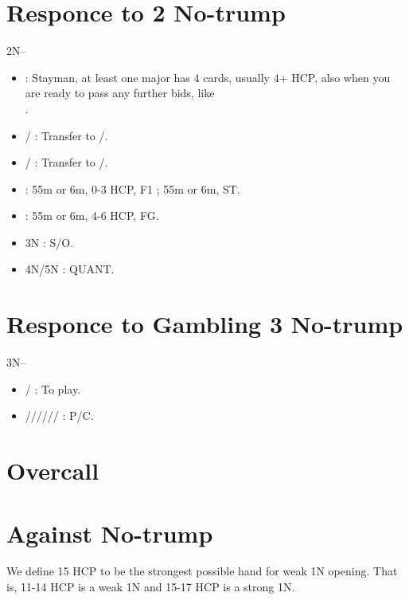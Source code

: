 \documentclass[12pt,twoside,a5paper]{report}%
\begin{document}
\chapter*{Responce to 2 No-trump}
	2N--\\
	\begin{itemize}
	\renewcommand{\labelitemi}{}
	\item {}: Stayman, at least one major has 4 cards, usually 4+ HCP, also when you are ready to pass any further bids, like \\.
	\item {}/ : Transfer to /.
	\item {}/ : Transfer to /.
	\item {} : 55m or 6m, 0-3 HCP, F1 ; 55m or 6m, ST.
	\item {} : 55m or 6m, 4-6 HCP,  FG. 
	\item 3N : S/O.
	\item 4N/5N : QUANT.
	\end{itemize}

\chapter*{Responce to Gambling 3 No-trump}
	3N--\\
	\begin{itemize}
	\renewcommand{\labelitemi}{}
	\item {}/ : To play.
	\item {}////// : P/C.
	\end{itemize}

\chapter*{Overcall}
\chapter*{Against No-trump}
	We define 15 HCP to be the strongest possible hand for weak 1N opening. That is, 11-14 HCP is a weak 1N and 15-17 HCP is a strong 1N. 
\end{document}
